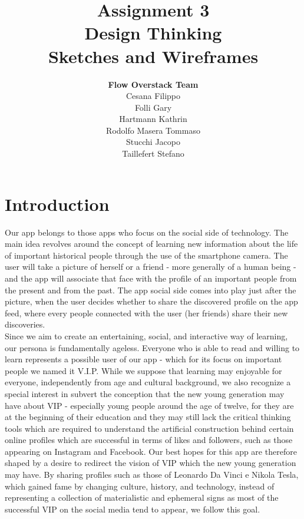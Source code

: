 \documentclass[12pt]{scrartcl}
\title{Assignment 3\\ Design Thinking\\ Sketches and Wireframes}
\author{\textbf{Flow Overstack Team}\\ Cesana Filippo\\ Folli Gary\\ Hartmann Kathrin\\ Rodolfo Masera Tommaso\\ Stucchi Jacopo\\ Taillefert Stefano}
\date{}
\begin{document}
\maketitle

\tableofcontents

\newpage


\section{Introduction}

	
	Our app belongs to those apps who focus on the social side of technology.  The main idea revolves around the concept of learning new information about the life of important historical people through the use of the smartphone camera. The user will take a picture of herself or a friend - more generally of a human being - and the app will associate that face with the profile of an important people from the present and from the past. The app social side comes into play just after the picture, when the user decides whether to share the discovered profile on the app feed, where every people connected with the user (her friends) share their new discoveries.\\
	
	Since we aim to create an entertaining, social, and interactive way of learning, our persona is fundamentally ageless. Everyone who is able to read and willing to learn represents a possible user of our app - which for its focus on important people we named it V.I.P. While we suppose that learning may enjoyable for everyone, independently from age and cultural background, we also recognize a special interest in subvert the conception that the new young generation may have about VIP - especially young people around the age of twelve, for they are at the beginning of their education and they may still lack the critical thinking tools which are required to understand the artificial construction behind certain online profiles which are successful in terms of likes and followers, such as those appearing on Instagram and Facebook. Our best hopes for this app are therefore shaped by a desire to redirect the vision of VIP which the new young generation may have. By sharing profiles such as those of Leonardo Da Vinci e Nikola Tesla, which gained fame by changing culture, history, and technology, instead of representing a collection of materialistic and ephemeral signs as most of the successful VIP on the social media tend to appear, we follow this goal.\\
  
\end{document}
